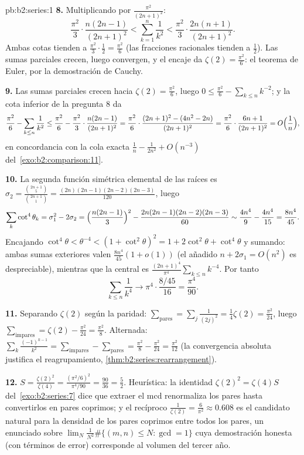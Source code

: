 \begin{solution}{pb:b2:series:1}
\textbf{8.} Multiplicando por $\frac{\pi^2}{(2n+1)^2}$:
\[
\frac{\pi^2}{3}\cdot\frac{n(2n-1)}{(2n+1)^2}
< \sum_{k=1}^{n}\frac1{k^2} <
\frac{\pi^2}{3}\cdot\frac{2n(n+1)}{(2n+1)^2}.
\]
Ambas cotas tienden a $\frac{\pi^2}3\cdot\frac12 =
\frac{\pi^2}6$ (las fracciones racionales tienden a $\frac12$).
Las sumas parciales crecen, luego convergen, y el encaje da
$\zeta(2) = \frac{\pi^2}6$: el teorema de Euler, por la
demostración de Cauchy.

\textbf{9.} Las sumas parciales crecen hacia $\zeta(2) =
\frac{\pi^2}6$, luego $0 \leq \frac{\pi^2}6 - \sum_{k\leq
n}k^{-2}$; y la cota inferior de la pregunta 8 da
\[
\frac{\pi^2}6 - \sum_{k\leq n}\frac1{k^2}
\leq \frac{\pi^2}6 - \frac{\pi^2}3\cdot\frac{n(2n-1)}{(2n+1)^2}
= \frac{\pi^2}6\cdot\frac{(2n+1)^2 - (4n^2 -
2n)}{(2n+1)^2}
= \frac{\pi^2}6\cdot\frac{6n + 1}{(2n+1)^2}
= O\Bigl(\frac1n\Bigr),
\]
en concordancia con la cola exacta $\frac1n - \frac1{2n^2} +
O(n^{-3})$ del~\cref{exo:b2:comparison:11}.

\textbf{10.} La segunda función simétrica elemental de las raíces
es $\sigma_2 = \frac{\binom{2n+1}5}{\binom{2n+1}1} =
\frac{(2n)(2n-1)(2n-2)(2n-3)}{120}$, luego
\[
\sum_k\cot^4\theta_k = \sigma_1^2 - 2\sigma_2
= \Bigl(\frac{n(2n-1)}3\Bigr)^2 -
\frac{2n(2n-1)(2n-2)(2n-3)}{60}
\sim \frac{4n^4}9 - \frac{4n^4}{15} = \frac{8n^4}{45}.
\]
Encajando $\cot^4\theta < \theta^{-4} < (1 + \cot^2\theta)^2 = 1 +
2\cot^2\theta + \cot^4\theta$ y sumando: ambas sumas exteriores
valen $\frac{8n^4}{45}(1 + o(1))$ (el añadido $n + 2\sigma_1 =
O(n^2)$ es despreciable), mientras que la central es
$\frac{(2n+1)^4}{\pi^4}\sum_{k\leq n}k^{-4}$. Por tanto
\[
\sum_{k\leq n}\frac1{k^4} \longrightarrow
\pi^4\cdot\frac{8/45}{16} = \frac{\pi^4}{90}.
\]

\textbf{11.} Separando $\zeta(2)$ según la paridad:
$\sum_{\text{pares}} = \sum_j\frac{1}{(2j)^2} = \frac14\zeta(2) =
\frac{\pi^2}{24}$, luego $\sum_{\text{impares}} = \zeta(2) -
\frac{\pi^2}{24} = \frac{\pi^2}8$. Alternada:
$\sum_k\frac{(-1)^{k-1}}{k^2} = \sum_{\text{impares}} -
\sum_{\text{pares}} = \frac{\pi^2}8 - \frac{\pi^2}{24} =
\frac{\pi^2}{12}$ (la convergencia absoluta justifica el
reagrupamiento, \cref{thm:b2:series:rearrangement}).

\textbf{12.} $S = \frac{\zeta(2)^2}{\zeta(4)} =
\frac{(\pi^2/6)^2}{\pi^4/90} = \frac{90}{36} = \frac52$.
Heurística: la identidad $\zeta(2)^2 = \zeta(4)S$ del~\cref{exo:b2:series:7} dice que extraer el mcd renormaliza los
pares hasta convertirlos en pares coprimos; y el recíproco
$\frac1{\zeta(2)} = \frac6{\pi^2} \approx 0.608$ es el candidato
natural para la densidad de los pares coprimos entre todos los
pares, un enunciado sobre $\lim_N \frac{1}{N^2}\#\{(m,n) \leq N :
\gcd = 1\}$ cuya demostración honesta (con términos de error)
corresponde al volumen del tercer año.


\end{solution}
